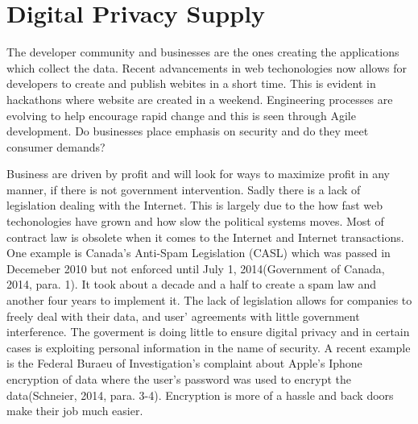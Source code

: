 \documentclass[12pt]{article}
\begin{document}
\section{Digital Privacy Supply}\label{sec:supply}

The developer community and businesses are the ones creating the applications which collect the data. Recent advancements in web techonologies now allows for developers to create and publish webites in a short time. This is evident in hackathons where website are created in a weekend. Engineering processes are evolving to help encourage rapid change and this is seen through Agile development. Do businesses place emphasis on security and do they meet consumer demands?

Business are driven by profit and will look for ways to maximize profit in any manner, if there is not government intervention. Sadly there is a lack of legislation dealing with the Internet. This is largely due to the how fast web techonologies have grown and how slow the political systems moves. Most of contract law is obsolete when it comes to the Internet and Internet transactions. One example is Canada's Anti-Spam Legislation (CASL) which was passed in Decemeber 2010 but not enforced until July 1, 2014(Government of Canada, 2014, para. 1). It took about a decade and a half to create a spam law and another four years to implement it. The lack of legislation allows for companies to freely deal with their data, and user' agreements with little government interference. The goverment is doing little to ensure digital privacy and in certain cases is exploiting personal information in the name of security. A recent example is the Federal Buraeu of Investigation's complaint about Apple's Iphone encryption of data where the user's password was used to encrypt the data(Schneier, 2014, para. 3-4). Encryption is more of a hassle and back doors make their job much easier.
\end{document}
